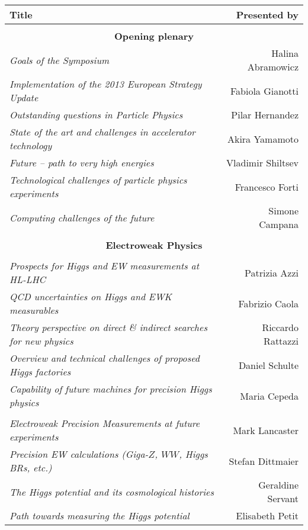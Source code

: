 \begin{flushleft}
\begin{tabular}{lr}
\bf Title & \bf Presented by \\ \hline 
\vspace*{-3mm} & \\
\multicolumn{2}{c}{\bf Opening plenary} \\
\it Goals of the Symposium & Halina Abramowicz \\
\it Implementation of the 2013 European Strategy Update & Fabiola Gianotti \\
\it Outstanding questions in Particle Physics & Pilar Hernandez\\
\it State of the art and challenges in accelerator technology  & Akira Yamamoto \\
\it Future -- path to very high energies & Vladimir Shiltsev \\
\it Technological challenges of particle physics experiments & Francesco Forti \\
\it Computing challenges of the future & Simone Campana \\ \hline 
\vspace*{-3mm} & \\
\multicolumn{2}{c}{\bf Electroweak Physics} \\
\vspace*{-3mm} & \\
\it Prospects for Higgs and EW measurements at HL-LHC & Patrizia Azzi \\
\it QCD uncertainties on Higgs and EWK measurables & Fabrizio Caola \\
\it Theory perspective on direct \& indirect searches for new physics & Riccardo Rattazzi \\
\it Overview and technical challenges of proposed Higgs factories & Daniel Schulte \\
\it Capability of future machines for precision Higgs physics & Maria Cepeda \\
\vspace*{-3mm} & \\
\it Electroweak Precision Measurements at future experiments & Mark Lancaster \\
\it Precision EW calculations (Giga-$Z$, $WW$, Higgs BRs, etc.) & Stefan Dittmaier \\
\it The Higgs potential and its cosmological histories & Geraldine Servant \\
\it Path towards measuring the Higgs potential & Elisabeth Petit \\

\end{tabular}
\end{flushleft}
